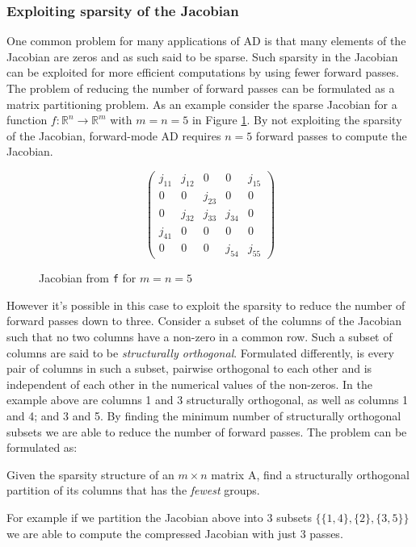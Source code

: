 	\subsubsection{Exploiting sparsity of the Jacobian}
	One common problem for many applications of AD is that many elements of the
	Jacobian
	are zeros and as such said to be sparse. Such sparsity in the Jacobian can 
	be exploited for more efficient computations by using fewer forward passes. The
	problem
	of reducing the number of forward passes can be formulated as a matrix
	partitioning problem. 
	As an example consider the sparse Jacobian for a function $f: \mathbb{R}^n \to 
	\mathbb{R}^m$ with $m=n=5$ in Figure \ref{fig:jacobian}. By not exploiting the
	sparsity of the Jacobian, forward-mode AD requires $n=5$ forward passes to
	compute the Jacobian.
	\begin{figure}[H]
		$$ \left(\begin{matrix}
		j_{11} & j_{12} & 0 & 0 & j_{15} \\
		0 & 0 & j_{23} & 0 & 0 \\
		0 & j_{32} & j_{33} & j_{34} & 0 \\
		j_{41} & 0 & 0 & 0 & 0 \\
		0 & 0 & 0 & j_{54} & j_{55} 
		\end{matrix}\right) $$
		\caption{Jacobian from \texttt{f} for $m=n=5$}
		\label{fig:jacobian}
	\end{figure}
	However it's possible in this case to exploit the sparsity to reduce the number
	of forward passes down to three. Consider a subset of the columns of the
	Jacobian such that no two columns have a non-zero in a common row. Such a subset
	of columns are said to be \emph{structurally orthogonal}. Formulated
	differently, is every pair of columns in such a subset, pairwise orthogonal to
	each other and is independent of each other in the numerical values of the
	non-zeros. In the example above are columns 1 and 3 structurally orthogonal, as
	well as columns 1 and 4; and 3 and 5. By finding the minimum number of
	structurally orthogonal subsets we are able to reduce the number of forward
	passes. 
	The problem can be formulated as:
	\begin{problem}
		Given the sparsity structure of an $m \times n$ matrix A, find a structurally
		orthogonal partition of its columns that has the \emph{fewest} groups.
		\label{prob:p1}
	\end{problem}
	For example if we partition the Jacobian above into 3 subsets $\{\{1,4\}, \{2\},
	\{3,5\}\}$ we are able to compute the compressed Jacobian with just 3 passes.
